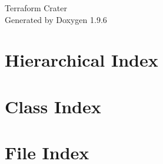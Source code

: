 \documentclass[twoside]{book}
\newcommand{\+}{\discretionary{\mbox{\scriptsize$\hookleftarrow$}}{}{}}
\newcommand{\clearemptydoublepage}{%
    \newpage{\pagestyle{empty}\cleardoublepage}%
  }
\begin{document}
  \raggedbottom

  



    \hypersetup{pageanchor=false,
                bookmarksnumbered=true,
                pdfencoding=unicode
               }


  \begin{titlepage}
  \vspace*{7cm}
  \begin{center}%
  {\Large Terraform Crater}\\

  \vspace*{1cm}
  {\large Generated by Doxygen 1.9.6}\\

  \end{center}
  \end{titlepage}


  \clearemptydoublepage


  \tableofcontents

  \clearemptydoublepage




  \hypersetup{pageanchor=true}




\chapter{Hierarchical Index}

\chapter{Class Index}

\chapter{File Index}

\end{document}
